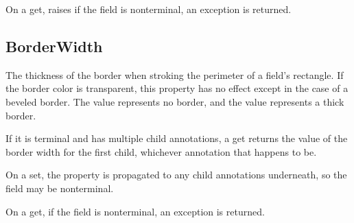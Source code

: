 \documentclass[letterpaper,12pt,english,openany,oneside]{sphinxmanual}
\begin{document}
On a get, raises  if the field is non\sphinxhyphen{}terminal, an exception is returned.

\label{\detokenize{IAC_API_FormsIntro:example-7}}

\begin{sphinxVerbatim}[commandchars=\\\{\}]
  
\end{sphinxVerbatim}




\subsection{BorderWidth}
\label{\detokenize{IAC_API_FormsIntro:borderwidth}}
The thickness of the border when stroking the perimeter of a field’s rectangle. If the border color is transparent, this property has no effect except in the case of a beveled border. The value  represents no border, and the value  represents a thick border.

\label{\detokenize{IAC_API_FormsIntro:syntax-12}}

\begin{sphinxVerbatim}[commandchars=\\\{\}]
\PYG{p}{[}\PYG{p}{]} 
\end{sphinxVerbatim}
\label{\detokenize{IAC_API_FormsIntro:returns-2}}

If it is terminal and has multiple child annotations, a get returns the value of the border width for the first child, whichever annotation that happens to be.

On a set, the property is propagated to any child annotations underneath, so the field may be non\sphinxhyphen{}terminal.

\label{\detokenize{IAC_API_FormsIntro:exceptions-7}}

On a get, if the field is non\sphinxhyphen{}terminal, an exception  is returned.

\label{\detokenize{IAC_API_FormsIntro:example-8}}
\end{document}
